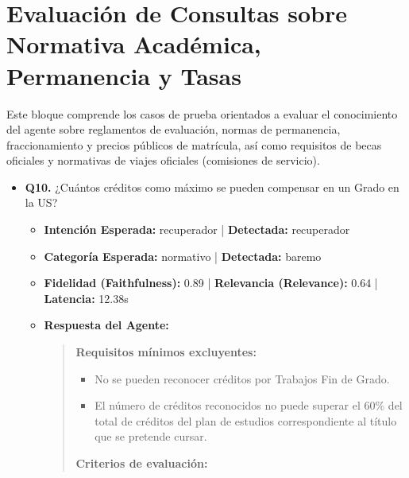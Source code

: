 \documentclass[12pt,a4paper,oneside]{report}
\begin{document}
\begin{itemize}
  
\end{itemize}

\section{Evaluación de Consultas sobre Normativa Académica, Permanencia y Tasas}
Este bloque comprende los casos de prueba orientados a evaluar el conocimiento del agente sobre reglamentos de evaluación, normas de permanencia, fraccionamiento y precios públicos de matrícula, así como requisitos de becas oficiales y normativas de viajes oficiales (comisiones de servicio).

\begin{itemize}
\item \textbf{Q10.} ¿Cuántos créditos como máximo se pueden compensar en un Grado en la US? \\
        \begin{itemize}
          \item \textbf{Intención Esperada:} recuperador | \textbf{Detectada:} recuperador
          \item \textbf{Categoría Esperada:} normativo | \textbf{Detectada:} baremo
          \item \textbf{Fidelidad (Faithfulness):} 0.89 | \textbf{Relevancia (Relevance):} 0.64 | \textbf{Latencia:} 12.38s
          \item \textbf{{Respuesta del Agente:}} \\
                \begin{quote}
\textbf{Requisitos mínimos excluyentes:}
\begin{itemize}
  \item No se pueden reconocer créditos por Trabajos Fin de Grado.
  \item El número de créditos reconocidos no puede superar el 60\% del total de créditos del plan de estudios correspondiente al título que se pretende cursar.
\end{itemize}

\textbf{Criterios de evaluación:}


\end{quote}
\end{itemize}
\end{itemize}
\end{document}
